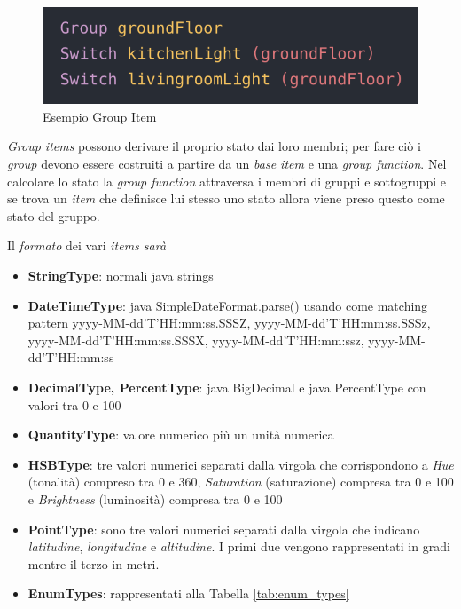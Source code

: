 \begin{figure}
    \centering
    \includegraphics{Immagini/GroupItemExample}
    \caption{Esempio Group Item}
    \label{fig:group_item_example}
\end{figure}

{\em Group items} possono derivare il proprio stato dai loro membri; per fare ciò i {\em group} devono essere costruiti a partire da un {\em base item} e una {\em group function}. Nel calcolare lo stato la {\em group function} attraversa i membri di gruppi e sottogruppi e se trova un {\em item} che definisce lui stesso uno stato allora viene preso questo come stato del gruppo.

Il {\em formato} dei vari {\em items sarà}
\begin{itemize}
    \item \textbf{StringType}: normali java strings
    \item \textbf{DateTimeType}: java SimpleDateFormat.parse() usando come matching pattern yyyy-MM-dd'T'HH:mm:ss.SSSZ, yyyy-MM-dd'T'HH:mm:ss.SSSz, yyyy-MM-dd'T'HH:mm:ss.SSSX, yyyy-MM-dd'T'HH:mm:ssz, yyyy-MM-dd'T'HH:mm:ss
    \item \textbf{DecimalType, PercentType}: java BigDecimal e java PercentType con valori tra 0 e 100
    \item \textbf{QuantityType}: valore numerico più un unità numerica
    \item \textbf{HSBType}: tre valori numerici separati dalla virgola che corrispondono a {\em Hue} (tonalità) compreso tra 0 e 360, {\em Saturation} (saturazione) compresa tra 0 e 100 e {\em Brightness} (luminosità) compresa tra 0 e 100
    \item \textbf{PointType}: sono tre valori numerici separati dalla virgola che indicano {\em latitudine}, {\em longitudine} e {\em altitudine}. I primi due vengono rappresentati in gradi mentre il terzo in metri.
    \item  \textbf{EnumTypes}: rappresentati alla Tabella \ref{tab:enum_types}
\end{itemize}

